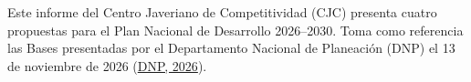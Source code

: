 \begingroup
Este informe del Centro Javeriano de Competitividad (CJC) presenta cuatro propuestas para el Plan Nacional de Desarrollo 2026--2030. Toma como referencia las Bases presentadas por el Departamento Nacional de Planeación (DNP) el 13 de noviembre de 2026 (\hyperref[ref:bib:dnp_bases2026]{DNP, 2026}). %
\par\endgroup

%
%
%
